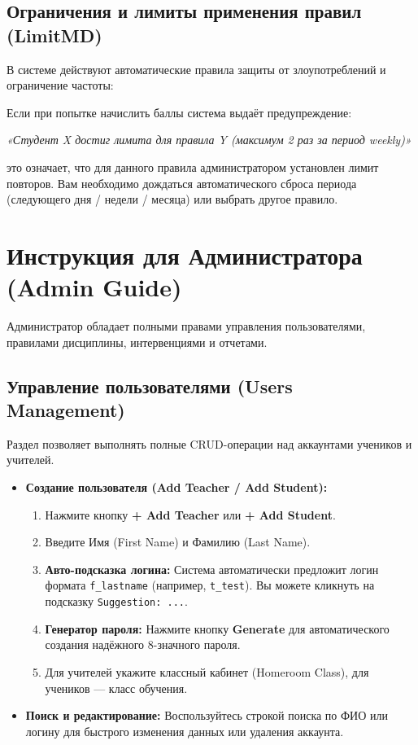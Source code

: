 \documentclass[12pt,a4paper]{article}
\begin{document}
\subsection{Ограничения и лимиты применения правил (LimitMD)}
В системе действуют автоматические правила защиты от злоупотреблений и ограничение частоты:
\begin{warningBox}
Если при попытке начислить баллы система выдаёт предупреждение:
\begin{center}
\textit{«Студент X достиг лимита для правила Y (максимум 2 раз за период weekly)»}
\end{center}
это означает, что для данного правила администратором установлен лимит повторов. Вам необходимо дождаться автоматического сброса периода (следующего дня / недели / месяца) или выбрать другое правило.
\end{warningBox}

\newpage

\section{Инструкция для Администратора (Admin Guide)}

Администратор обладает полными правами управления пользователями, правилами дисциплины, интервенциями и отчетами.

\subsection{Управление пользователями (Users Management)}
Раздел позволяет выполнять полные CRUD-операции над аккаунтами учеников и учителей.

\begin{itemize}
    \item \textbf{Создание пользователя (Add Teacher / Add Student):}
    \begin{enumerate}
        \item Нажмите кнопку \textbf{+ Add Teacher} или \textbf{+ Add Student}.
        \item Введите Имя (First Name) и Фамилию (Last Name).
        \item \textbf{Авто-подсказка логина:} Система автоматически предложит логин формата \texttt{f\_lastname} (например, \texttt{t\_test}). Вы можете кликнуть на подсказку \texttt{Suggestion: ...}.
        \item \textbf{Генератор пароля:} Нажмите кнопку \textbf{Generate} для автоматического создания надёжного 8-значного пароля.
        \item Для учителей укажите классный кабинет (Homeroom Class), для учеников — класс обучения.
    \end{enumerate}
    \item \textbf{Поиск и редактирование:} Воспользуйтесь строкой поиска по ФИО или логину для быстрого изменения данных или удаления аккаунта.
\end{itemize}
\end{document}
